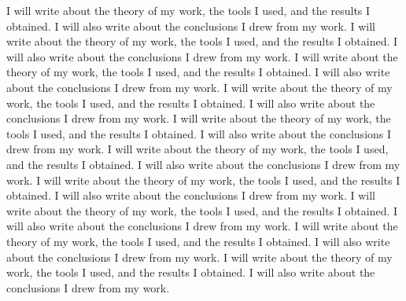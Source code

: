 I will write about the theory of my work, the tools I used, and the results I obtained. I will also write about the conclusions I drew from my work.
I will write about the theory of my work, the tools I used, and the results I obtained. I will also write about the conclusions I drew from my work.
I will write about the theory of my work, the tools I used, and the results I obtained. I will also write about the conclusions I drew from my work.
I will write about the theory of my work, the tools I used, and the results I obtained. I will also write about the conclusions I drew from my work.
I will write about the theory of my work, the tools I used, and the results I obtained. I will also write about the conclusions I drew from my work.
I will write about the theory of my work, the tools I used, and the results I obtained. I will also write about the conclusions I drew from my work.
I will write about the theory of my work, the tools I used, and the results I obtained. I will also write about the conclusions I drew from my work.
I will write about the theory of my work, the tools I used, and the results I obtained. I will also write about the conclusions I drew from my work.
I will write about the theory of my work, the tools I used, and the results I obtained. I will also write about the conclusions I drew from my work.
I will write about the theory of my work, the tools I used, and the results I obtained. I will also write about the conclusions I drew from my work.
